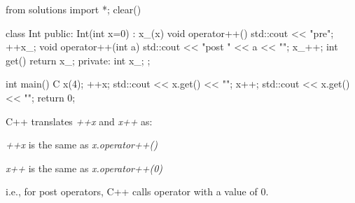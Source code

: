 \begin{python0}
from solutions import *; clear()
\end{python0}

\begin{consolethree}[escapeinside=||]
class Int
{
public:
    Int(int x=0)
        : x_(x)
    {}
    void operator++()
    {
        std::cout << "pre\n"; ++x_;
    }
    void operator++(int a)
    {
        std::cout << "post " << a << "\n"; x_++;
    }
    int get() { return x_; }
private:
    int x_;
};
\end{consolethree}

\begin{consolethree}[escapeinside=||]
int main()
{
    C x(4);
    ++x;
    std::cout << x.get() << "\n";
    x++;
    std::cout << x.get() << "\n";
    return 0;
}
\end{consolethree}

C++ translates \textit{++x} and \textit{x++} as:

\textit{++x} is the same as \textit{x.operator++()}

\textit{x++} is the same as \textit{x.operator++(0)}

i.e., for post operators, C++ calls operator with a value of 0.



